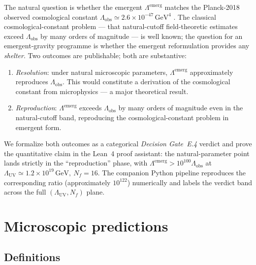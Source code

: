 \documentclass[twocolumn]{revtex4-2}
\newcommand{\Nf}{N_f}
\newcommand{\LambdaUV}{\Lambda_{\mathrm{UV}}}
\newcommand{\Lambdaemerg}{\Lambda^{\mathrm{emerg}}}
\newcommand{\Lambdaobs}{\Lambda_{\mathrm{obs}}}
\begin{document}
The natural question is whether the emergent
$\Lambdaemerg$ matches the Planck-2018 observed cosmological
constant $\Lambdaobs \simeq 2.6\times 10^{-47}\,\mathrm{GeV}^{4}$
\cite{Planck2018}. The classical cosmological-constant problem ---
that natural-cutoff field-theoretic estimates exceed $\Lambdaobs$ by
many orders of magnitude --- is well known; the question for an
emergent-gravity programme is whether the emergent reformulation
provides any \emph{shelter}. Two outcomes are publishable; both are
substantive:

\begin{enumerate}
\item \emph{Resolution}: under natural microscopic parameters,
$\Lambdaemerg$ approximately reproduces $\Lambdaobs$. This would
constitute a derivation of the cosmological constant from
microphysics --- a major theoretical result.
\item \emph{Reproduction}: $\Lambdaemerg$ exceeds $\Lambdaobs$ by
many orders of magnitude even in the natural-cutoff band,
reproducing the cosmological-constant problem in emergent form.
\end{enumerate}

We formalize both outcomes as a categorical \emph{Decision Gate~E.4}
verdict and prove the quantitative claim in the Lean~4 proof
assistant: the natural-parameter point lands strictly in the
``reproduction'' phase, with $\Lambdaemerg > 10^{100}\Lambdaobs$ at
$\LambdaUV \simeq 1.2\times 10^{19}\,\mathrm{GeV},\ \Nf = 16$.
The companion Python pipeline reproduces the corresponding ratio
(approximately $10^{122}$) numerically and labels the verdict band
across the full $(\LambdaUV,\Nf)$ plane.

\section{Microscopic predictions}

\subsection{Definitions}
\end{document}
